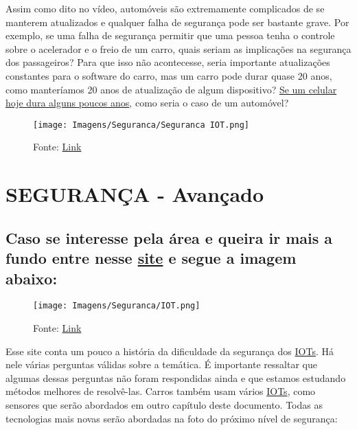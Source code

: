 \documentclass{article}
\begin{document}
Assim como dito no vídeo, automóveis são extremamente complicados de se manterem atualizados e qualquer falha de segurança pode ser bastante grave. Por exemplo, se uma falha de segurança permitir que uma pessoa tenha o controle sobre o acelerador e o freio de um carro, quais seriam as implicações na segurança dos passageiros? Para que isso não acontecesse, seria importante atualizações constantes para o software do carro, mas um carro pode durar quase 20 anos, como manteríamos 20 anos de atualização de algum dispositivo? \href{https://www.tecmundo.com.br/celular/28427-quanto-tempo-dura-um-smartphone-.htm}{Se um celular hoje dura alguns poucos anos}, como seria o caso de um automóvel?


\begin{figure}[ht]
    \centering
    \texttt{[image: Imagens/Seguranca/Seguranca IOT.png]}
    \caption{Fonte: \href{https://bics.com/iot-safe-robust-iot-security-at-scale/}{Link}}
\end{figure}


\newpage

\section*{SEGURANÇA - Avançado}

\subsection*{Caso se interesse pela área e queira ir mais a fundo entre nesse \href{https://bluepex.com.br/industria-iot/}{site} e segue a imagem abaixo:}


\begin{figure}[ht]
    \centering
    \texttt{[image: Imagens/Seguranca/IOT.png]}
    \caption{Fonte: \href{https://bluepex.com.br/industria-iot/}{Link}}
\end{figure}


Esse site conta um pouco a história da dificuldade da segurança dos \href{https://pt.wikipedia.org/wiki/Internet_das_coisas}{IOTs}. Há nele várias perguntas válidas sobre a temática. É importante ressaltar que algumas dessas perguntas não foram respondidas ainda e que estamos estudando métodos melhores de resolvê-las. Carros também usam vários \href{https://pt.wikipedia.org/wiki/Internet_das_coisas}{IOTs}, como sensores que serão abordados em outro capítulo deste documento. Todas as tecnologias mais novas serão abordadas na foto do próximo nível de segurança:
\end{document}
